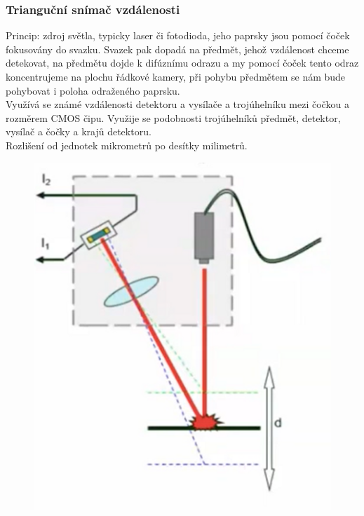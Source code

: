 \subsubsection{Trianguční snímač vzdálenosti}
Princip: zdroj světla, typicky laser či fotodioda, jeho paprsky jsou pomocí čoček fokusovány do svazku. Svazek pak dopadá na předmět, jehož vzdálenost chceme detekovat, na předmětu dojde k difúznímu odrazu a my pomocí čoček tento odraz koncentrujeme na plochu řádkové kamery, při pohybu předmětem se nám bude pohybovat i poloha odraženého paprsku.\\
Využívá se známé vzdálenosti detektoru a vysílače a trojúhelníku mezi čočkou a rozměrem CMOS čipu. Využije se podobnosti trojúhelníků předmět, detektor, vysílač a čočky a krajů detektoru.\\
Rozlišení od jednotek mikrometrů po desítky milimetrů.\\
\begin{figure}[h!]
    \centering
    \includegraphics[scale = 0.1]{img/Triang.png}
\end{figure}

